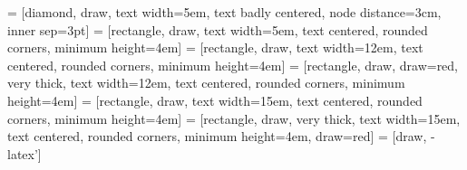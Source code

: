 \documentclass{article}
\begin{document}
\newcommand{\mcode} {\texttt{GS\_MotherCode.r}}
\newcommand{\bigtt}[1] {\textcolor{darkblue}{{\large {\texttt{#1}}}}}
\renewcommand{\tablename}{Tableau}
\makeatletter
 \newcommand{\nop}[1]{\Hy@raisedlink{\hypertarget{#1}{}}}
\makeatother


\tableofcontents

 = [diamond, draw,
    text width=5em, text badly centered, node distance=3cm, inner sep=3pt]
 = [rectangle, draw,
    text width=5em, text centered, rounded corners, minimum height=4em]
 = [rectangle, draw,
    text width=12em, text centered, rounded corners, minimum height=4em]
 = [rectangle, draw, draw=red, very thick,
   text width=12em, text centered, rounded corners, minimum height=4em]
 = [rectangle, draw,
    text width=15em, text centered, rounded corners, minimum height=4em]
 = [rectangle, draw, very thick,
    text width=15em, text centered, rounded corners, minimum
    height=4em, draw=red]
 = [draw, -latex']


\newpage
\thispagestyle{empty}
\end{document}

